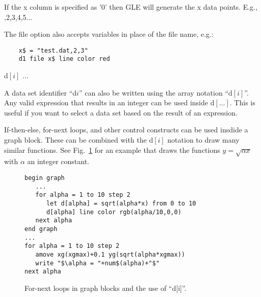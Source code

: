 \begin{commanddescription}
If the x column is specified as {\sf '0'} then GLE will generate the x data points. E.g., {,2,3,4,5...}

The file option also accepts variables in place of the file name, e.g.:

\begin{Verbatim}
	x$ = "test.dat,2,3"
	d1 file x$ line color red
\end{Verbatim}

% 
% 

\item[{\sf d$\left[i\right]$ $\ldots$}]

A data set identifier ``d$i$'' can also be written using the array notation ``d$\left[i\right]$''. Any valid expression that results in an integer can be used inside d$\left[\ldots\right]$. This is useful if you want to select a data set based on the result of an expression.

If-then-else, for-next loops, and other control constructs can be used insdide a graph block. These can be combined with the d$\left[i\right]$ notation to draw many similar functions. See Fig.~\ref{fig:sqroot} for an example that draws the functions $y = \sqrt{\alpha x}$ with $\alpha$ an integer constant.

\begin{figure}[tb]
\begin{minipage}[c]{9.2cm}
\begin{Verbatim}
begin graph
   ...
   for alpha = 1 to 10 step 2
      let d[alpha] = sqrt(alpha*x) from 0 to 10
      d[alpha] line color rgb(alpha/10,0,0)
   next alpha
end graph
...
for alpha = 1 to 10 step 2
   amove xg(xgmax)+0.1 yg(sqrt(alpha*xgmax))
   write "$\alpha = "+num$(alpha)+"$"
next alpha
\end{Verbatim}
\end{minipage}
\hfill
\begin{minipage}[c]{7cm}
\mbox{}
\end{minipage}
\caption{\label{fig:sqroot}For-next loops in graph blocks and the use of ``d[i]''.}
\end{figure}


\end{commanddescription}

